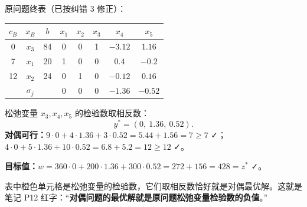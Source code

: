 \begin{figure}[!htbp]\centering
{}
\end{figure}

\begin{examplebox}[例 3.1　验证煤电油问题 $z^*=w^*$ \srcTag{笔记 P13}]
\begin{minipage}[t]{0.5\linewidth}
原问题终表（已按纠错 3 修正）：
\begin{center}\small
\begin{tabular}{@{}ccc|ccccc@{}}
\toprule
$c_B$ & $x_B$ & $b$ & $x_1$ & $x_2$ & $x_3$ & $x_4$ & $x_5$\\\midrule
0 & $x_3$ & 84 & 0 & 0 & 1 & $-3.12$ & $1.16$\\
7 & $x_1$ & 20 & 1 & 0 & 0 & $0.4$ & $-0.2$\\
12 & $x_2$ & 24 & 0 & 1 & 0 & $-0.12$ & $0.16$\\\midrule
\multicolumn{3}{c|}{$\sigma_j$} & 0 & 0 & \cellcolor{shiftc!25}0 & \cellcolor{shiftc!25}$-1.36$ & \cellcolor{shiftc!25}$-0.52$\\\bottomrule
\end{tabular}
\end{center}
\end{minipage}\hfill
\begin{minipage}[t]{0.47\linewidth}
松弛变量 $x_3,x_4,x_5$ 的检验数取相反数：
\[y^*=(0,\ 1.36,\ 0.52).\]
\textbf{对偶可行：}$9\cdot0+4\cdot1.36+3\cdot0.52=5.44+1.56=7\ge7$ ✓；$4\cdot0+5\cdot1.36+10\cdot0.52=6.8+5.2=12\ge12$ ✓。\par
\textbf{目标值：}$w=360\cdot0+200\cdot1.36+300\cdot0.52=272+156=428=z^*$ ✓。
\end{minipage}
\end{examplebox}
表中橙色单元格是松弛变量的检验数，它们取相反数恰好就是对偶最优解。这就是笔记 P12 红字：“\textbf{对偶问题的最优解就是原问题松弛变量检验数的负值}。”

